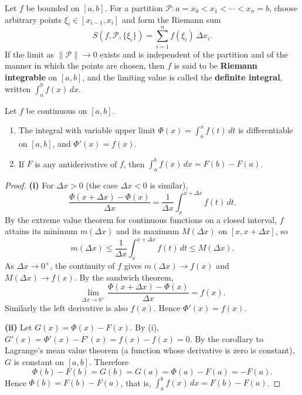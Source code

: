 \begin{definition}\label{def:riemann_integral}
Let $f$ be bounded on $[a,b]$. For a partition $\mathcal{P}: a = x_0 < x_1 < \cdots < x_n = b$, choose arbitrary points $\xi_i \in [x_{i-1}, x_i]$ and form the Riemann sum
\[S(f, \mathcal{P}, \{\xi_i\}) = \sum_{i=1}^{n} f(\xi_i)\,\Delta x_i.\]
If the limit as $\|\mathcal{P}\| \to 0$ exists and is independent of the partition and of the manner in which the points are chosen, then $f$ is said to be \textbf{Riemann integrable} on $[a,b]$, and the limiting value is called the \textbf{definite integral}, written $\int_a^b f(x)\,dx$.
\end{definition}

\begin{theorem}\label{thm:ftc}
Let $f$ be continuous on $[a,b]$.
\begin{enumerate}[label=(\roman*)]
    \item The integral with variable upper limit $\Phi(x) = \int_a^x f(t)\,dt$ is differentiable on $[a,b]$, and $\Phi'(x) = f(x)$.
    \item If $F$ is any antiderivative of $f$, then $\int_a^b f(x)\,dx = F(b) - F(a)$.
\end{enumerate}
\end{theorem}

\begin{proof}
\textbf{(i)} For $\Delta x > 0$ (the case $\Delta x < 0$ is similar),
\[
\frac{\Phi(x+\Delta x) - \Phi(x)}{\Delta x} = \frac{1}{\Delta x}\int_x^{x+\Delta x} f(t)\,dt.
\]
By the extreme value theorem for continuous functions on a closed interval, $f$ attains its minimum $m(\Delta x)$ and its maximum $M(\Delta x)$ on $[x, x+\Delta x]$, so
\[
m(\Delta x) \le \frac{1}{\Delta x}\int_x^{x+\Delta x} f(t)\,dt \le M(\Delta x).
\]
As $\Delta x \to 0^+$, the continuity of $f$ gives $m(\Delta x) \to f(x)$ and $M(\Delta x) \to f(x)$. By the sandwich theorem,
\[
\lim_{\Delta x \to 0^+} \frac{\Phi(x+\Delta x) - \Phi(x)}{\Delta x} = f(x).
\]
Similarly the left derivative is also $f(x)$. Hence $\Phi'(x) = f(x)$.

\textbf{(ii)} Let $G(x) = \Phi(x) - F(x)$. By (i), $G'(x) = \Phi'(x) - F'(x) = f(x) - f(x) = 0$. By the corollary to Lagrange's mean value theorem (a function whose derivative is zero is constant), $G$ is constant on $[a,b]$. Therefore
\[
\Phi(b) - F(b) = G(b) = G(a) = \Phi(a) - F(a) = -F(a).
\]
Hence $\Phi(b) = F(b) - F(a)$, that is, $\int_a^b f(x)\,dx = F(b) - F(a)$.
\end{proof}


